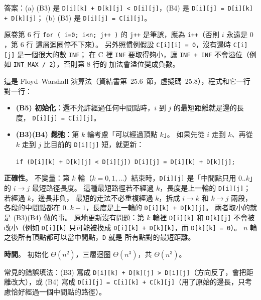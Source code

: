 \begin{pastsoln}
答案：(a) (B3) 是 \texttt{D[i][k] + D[k][j] < D[i][j]}，(B4) 是 \texttt{D[i][j] = D[i][k] + D[k][j]}；
(b) (B5) 是 \texttt{D[i][j] = C[i][j]}。

原卷第 6 行 \texttt{for ( i=0; i<n; j++ )} 的 \texttt{j++} 是筆誤，應為 \texttt{i++}（否則 $i$ 永遠是 $0$，第 6 行
這層迴圈停不下來）。 另外照慣例假設 \texttt{C[i][i] = 0}，沒有邊時 \texttt{C[i][j]} 是一個很大的數 \texttt{INF}；
在 C 裡 \texttt{INF} 要取得夠小，讓 \texttt{INF + INF} 不會溢位（例如 \texttt{INT\_MAX / 2}），否則第 8 行的
加法會溢位變成負數。

這是 Floyd--Warshall 演算法（資結書第~25.6~節，虛擬碼~25.8），程式和它一行對一行：
\begin{itemize}
\item \textbf{(B5) 初始化}：還不允許經過任何中間點時，$i$ 到 $j$ 的最短距離就是邊的長度，
\texttt{D[i][j] = C[i][j]}。
\item \textbf{(B3)(B4) 鬆弛}：第 $k$ 輪考慮「可以經過頂點 $k$」。 如果先從 $i$ 走到 $k$、再從 $k$ 走到 $j$
比目前的 \texttt{D[i][j]} 短，就更新：
\begin{center}
\texttt{if (D[i][k] + D[k][j] < D[i][j]) D[i][j] = D[i][k] + D[k][j];}
\end{center}
\end{itemize}

\textbf{正確性}。 不變量：第 $k$ 輪（$k = 0, 1, \ldots$）結束時，\texttt{D[i][j]} 是「中間點只用 $0..k$」的
$i \to j$ 最短路徑長度。 這種最短路徑若不經過 $k$，長度是上一輪的 \texttt{D[i][j]}；若經過 $k$，邊長非負，
最短的走法不必重複經過 $k$，拆成 $i \to k$ 和 $k \to j$ 兩段，各段的中間點都在 $0..k-1$，長度是上一輪的
\texttt{D[i][k] + D[k][j]}。 兩者取小的就是 (B3)(B4) 做的事。 原地更新沒有問題：第 $k$ 輪裡
\texttt{D[i][k]} 和 \texttt{D[k][j]} 不會被改小（例如 \texttt{D[i][k]} 只可能被換成
\texttt{D[i][k] + D[k][k]}，而 \texttt{D[k][k] = 0}）。 $n$ 輪之後所有頂點都可以當中間點，\texttt{D} 就是
所有點對的最短距離。

\textbf{時間}。 初始化 $\Theta(n^2)$，三層迴圈 $\Theta(n^3)$，共 $\Theta(n^3)$。

常見的錯誤填法：(B3) 寫成 \texttt{D[i][k] + D[k][j] > D[i][j]}（方向反了，會把距離改大），或 (B4) 寫成
\texttt{D[i][j] = C[i][k] + C[k][j]}（用了原始的邊長，只考慮恰好經過一個中間點的路徑）。
\end{pastsoln}
